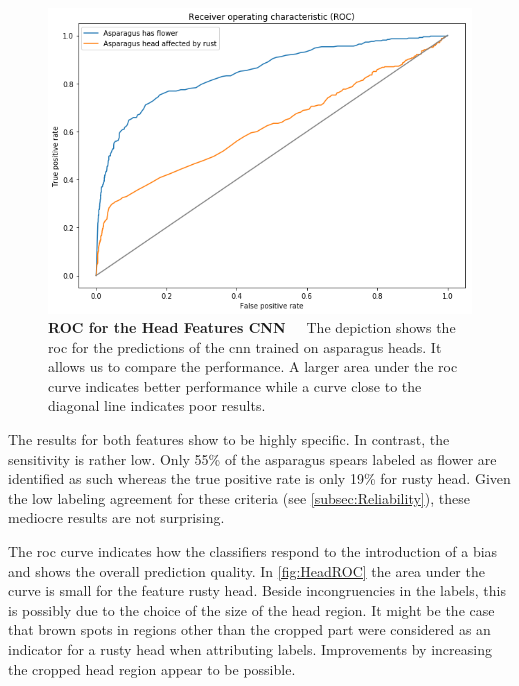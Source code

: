 \begin{figure}[!t]
	\centering
	\vspace{2cm}
	\includegraphics[scale=1.55]{Figures/chapter04/head_roc.png}
	\decoRule
	\caption[Head Features CNN ROC Curve]{\textbf{ROC for the Head Features CNN}~~~The depiction shows the \acrfull{roc} for the predictions of the \acrshort{cnn} trained on asparagus heads. It allows us to compare the performance. A larger area under the \acrshort{roc} curve indicates better performance while a curve close to the diagonal line indicates poor results.}
	\label{fig:HeadROC}
\end{figure}

\bigskip
The results for both features show to be highly specific. In contrast, the sensitivity is rather low. Only 55\% of the asparagus spears labeled as flower are identified as such whereas the true positive rate is only 19\% for rusty head. Given the low labeling agreement for these criteria (see \autoref{subsec:Reliability}), these mediocre results are not surprising.

The \acrshort{roc} curve indicates how the classifiers respond to the introduction of a bias and shows the overall prediction quality. In \autoref{fig:HeadROC} the area under the curve is small for the feature rusty head. Beside incongruencies in the labels, this is possibly due to the choice of the size of the head region. It might be the case that brown spots in regions other than the cropped part were considered as an indicator for a rusty head when attributing labels. Improvements by increasing the cropped head region appear to be possible.

